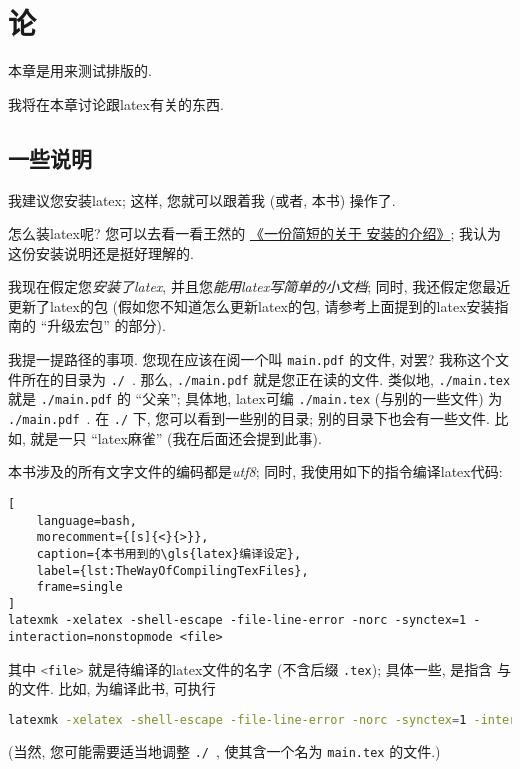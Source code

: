 \chapter{\theauthor{}论}

\begin{remark*}
    本章是用来测试排版的.
\end{remark*}

我将在本章讨论跟\gls{latex}有关的东西.

\section{一些说明}

我建议您安装\gls{latex};
这样, 您就可以跟着我 (或者, 本书) 操作了.

怎么装\gls{latex}呢?
您可以去看一看王然的%
\href{http://mirrors.ctan.org/info/install-latex-guide-zh-cn/install-latex-guide-zh-cn.pdf}%
{《一份简短的关于  安装的介绍》};
我认为这份安装说明还是挺好理解的.

我现在假定您\emph{安装了\gls{latex}},
并且您\emph{能用\gls{latex}写简单的小文档};
同时, 我还假定您最近更新了\gls{latex}的包
(假如您不知道怎么更新\gls{latex}的包,
请参考上面提到的\gls{latex}安装指南的 ``升级宏包'' 的部分).

我提一提路径的事项.
您现在应该在阅一个叫 \verb`main.pdf` 的文件, 对罢?
我称这个文件所在的目录为 \verb`./`~.
那么, \verb`./main.pdf` 就是您正在读的文件.
类似地, \verb`./main.tex` 就是 \verb`./main.pdf` 的 ``父亲'';
具体地, \gls{latex}可编 \verb`./main.tex`
(与别的一些文件) 为 \verb`./main.pdf`~.
在 \verb`./` 下, 您可以看到一些别的目录;
别的目录下也会有一些文件.
比如,  就是一只 ``\gls{latex}麻雀''
(我在后面还会提到此事).

本书涉及的所有文字文件的编码都是\emph{\gls{utf8}};
同时, 我使用如下的指令编译\gls{latex}代码:
\begin{lstlisting}[
    language=bash,
    morecomment={[s]{<}{>}},
    caption={本书用到的\gls{latex}编译设定},
    label={lst:TheWayOfCompilingTexFiles},
    frame=single
]
latexmk -xelatex -shell-escape -file-line-error -norc -synctex=1 -interaction=nonstopmode <file>
\end{lstlisting}
其中 \lstinline[language=bash,morecomment={[s]{<}{>}}]`<file>`
就是待编译的\gls{latex}文件的名字 (不含后缀 \verb`.tex`);
具体一些, 是指含 \verb``
与 \verb`` 的文件.
比如, 为编译此书, 可执行
\begin{lstlisting}[language=bash,morecomment={[s]{<}{>}}]
latexmk -xelatex -shell-escape -file-line-error -norc -synctex=1 -interaction=nonstopmode ./main
\end{lstlisting}
(当然, 您可能需要适当地调整 \verb`./`~,
使其含一个名为 \verb`main.tex` 的文件.)

